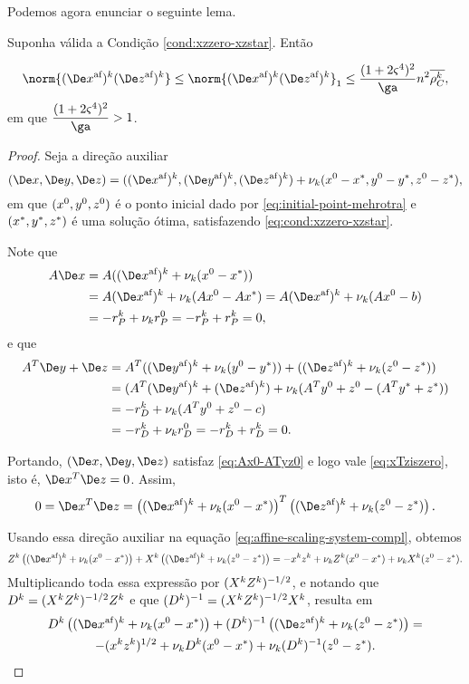 Podemos agora enunciar o seguinte lema.
\begin{lema}\label{lemma:boundDxDzaff}
Suponha válida a Condição  \ref{cond:xzzero-xzstar}. Então 

\begin{equation}
	\label{eq:normDxDzaff}
			\norm{ \dekx  \dekz  } \leq \norm{ \dekx  \dekz  }_{1}  \leq  \frac{(1 + 2\bdxzstar^{4})^{2} }{\ga} n^{2}\rhoCkb,
\end{equation}
em que $\dfrac{(1 + 2\bdxzstar^{4})^{2} }{\ga}>\num{1}$.
\end{lema}
\begin{proof}
	Seja a direção  auxiliar
	\[
		(\Dex,\Dey,\Dez)  = ( \dekx,  \deky  ,  \dekz  ) + \nuk (\xzero - \xstar,\yzero - \ystar,\zzero - \zstar), 
	\]
em que $(x^0,y^0,z^0)$ é o ponto inicial dado por \eqref{eq:initial-point-mehrotra} e  $(x^*,y^*,z^*)$ é uma  solução ótima, satisfazendo \eqref{eq:cond:xzzero-xzstar}.
	
	Note que 
\[
\begin{aligned}
A\Dex & = A( \dekx + \nuk (\xzero - \xstar)) \\
& =  A\dekx + \nuk (A\xzero - A\xstar)  =  A\dekx + \nuk (A\xzero - b)\\
& = -r_{P}^{k}  + \nuk  r_{P}^{0}   = -r_{P}^{k} + r_{P}^{k} = 0,  
\end{aligned}
\]
e que
\[
\begin{aligned}
A^{T}\Dey + \Dez  & = 	A^{T}(\deky + \nuk (\yzero - \ystar)) + (\dekz + \nuk (\zzero - \zstar)) \\
							& = 	(A^{T}\deky  + \dekz) + \nuk (A^{T}\yzero  + \zzero  - (A^{T}\ystar +  \zstar)) \\
							& = 	- r_{D}^{k} + \nuk (A^{T}\yzero  + \zzero  - c) \\
							& = - r_{D}^{k}  + \nuk  r_{D}^{0}   = -r_{D}^{k} + r_{D}^{k} = 0.   
\end{aligned}
\]


Portando, $(\Dex,\Dey,\Dez)$  satisfaz \eqref{eq:Ax0-ATyz0} e logo vale \eqref{eq:xTziszero}, isto é, $\Dex^{T}\Dez = 0$. Assim, 
	\begin{equation}
		\label{eq:DxDzaff1}
			 0 = \Dex^{T}\Dez = \left( \dekx +  \nuk (\xzero - \xstar)\right)^{T}\left(  \dekz   +  \nuk (\zzero - \zstar)\right).
	\end{equation}
	

	 Usando essa direção auxiliar na equação \eqref{eq:affine-scaling-system-compl}, obtemos 
	 \[
	 \Zk\left( \dekx +  \nuk (\xzero - \xstar)\right)+ \Xk \left(  \dekz   +  \nuk (\zzero - \zstar)\right) = -\xk\zk + \nuk  \Zk(\xzero - \xstar) + \nuk  \Xk(\zzero - \zstar).
	 \]
	 Multiplicando toda essa expressão por $(X^{k}Z^{k})^{-1/2}$, e notando que $D^{k}=(X^{k}Z^{k})^{-1/2}Z^{k}$ e que $(D^{k})^{-1}=(X^{k}Z^{k})^{-1/2}X^{k}$, resulta em 
	\begin{multline}
		\label{eq:DxDzaff2}
		 \Dk\left( \dekx  +  \nuk (\xzero - \xstar)\right)+ \Dik \left(  \dekz   +  \nuk (\zzero - \zstar)\right) = \\ -(\xk\zk)^{1/2} + \nuk  \Dk(\xzero - \xstar) + \nuk  \Dik(\zzero - \zstar).
		\end{multline}
	 

\end{proof}
